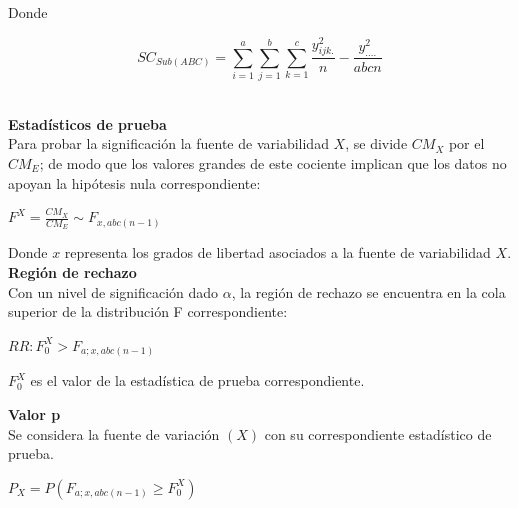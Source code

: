 Donde
\begin{center}
$$ SC_{Sub(ABC)} = \sum_{i=1}^{a}  \sum_{j=1}^{b}  \sum_{k=1}^{c} \frac{y_{ijk.}^{2}}{n} - \frac{y_{....}^{2}}{abcn}  $$\\
\end{center}


\textbf{Estadísticos de prueba}\\
Para probar la significación la fuente de variabilidad $X$, se divide $CM_{X}$ por el  $CM_{E}$; de modo que los valores grandes de este cociente implican que los datos no apoyan la hipótesis nula correspondiente:
\begin{center}
	$ F^{X} = \frac{CM_{X}}{CM_{E}} \sim F_{x,abc(n-1)}  $\\
\end{center}


Donde $x$ representa los grados de libertad asociados a la fuente de variabilidad $X$.\\

\textbf{Región de rechazo}\\

Con un nivel de significación dado $\alpha$, la región de rechazo se encuentra en la cola superior de la distribución F correspondiente:

\begin{center}
	$ RR : F_{0}^{X} > F_{a;x,abc(n-1)} $\\
\end{center}

$ F_{0}^{X} $ es el valor de la estadística de prueba correspondiente.

\textbf{Valor p}\\

Se considera la fuente de variación $(X)$ con su correspondiente estadístico de prueba.

\begin{center}
	$ P_{X} =  P( F_{a;x,abc(n-1)} \geq F_{0}^{X} ) $\\
\end{center}


